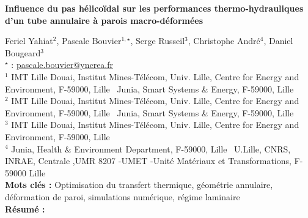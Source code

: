


    \newpage

\BgThispage

%
\begin{flushleft}
\addtocounter{section}{1}
{\Large \textbf{Influence du pas hélicoïdal sur les performances thermo-hydrauliques d'un tube annulaire à parois macro-déformées}}\label{ref:87}
\end{flushleft}
%
Feriel Yahiat$^{2}$, Pascale Bouvier$^{1,\star}$, Serge Russeil$^{3}$, Christophe André$^{4}$, Daniel Bougeard$^{3}$\\[2mm]
$^{\star}$ \Letter : \url{pascale.bouvier@yncrea.fr}\\[2mm]
{\footnotesize $^{1}$ IMT Lille Douai, Institut Mines-Télécom, Univ. Lille, Centre for Energy and Environment, F-59000, Lille \ Junia, Smart Systems \& Energy, F-59000, Lille}\\
{\footnotesize $^{2}$ IMT Lille Douai, Institut Mines-Télécom, Univ. Lille, Centre for Energy and Environment, F-59000, Lille \ Junia, Smart Systems \& Energy, F-59000, Lille}\\
{\footnotesize $^{3}$ IMT Lille Douai, Institut Mines-Télécom, Univ. Lille, Centre for Energy and Environment, F-59000, Lille}\\
{\footnotesize $^{4}$ Junia, Health \& Environment Department, F-59000, Lille \ U.Lille, CNRS, INRAE, Centrale ,UMR 8207 -UMET -Unité Matériaux et Transformations, F-59000 Lille}\\
[4mm]
%
\noindent \textbf{Mots clés : } Optimisation du transfert thermique, géométrie annulaire, déformation de paroi, simulations numérique, régime laminaire\\[4mm]
%
\noindent \textbf{Résumé : } 

